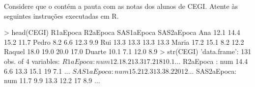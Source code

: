 \documentclass[addpoints]{exam}
\renewcommand*\half{.5}
\begin{document}
{\begin{questions}
	
	\question Considere que o  contém a pauta com as notas dos alunos de CEGI. Atente às seguintes instruções executadas em R.
	
		\begin{rcode}
			> head(CEGI)
			R1aEpoca R2aEpoca SAS1aEpoca SAS2aEpoca
			Ana        12.1     14.4       15.2       11.7
			Pedro       8.2      6.6       12.3        9.9
			Rui        13.3     13.3       13.3       13.3
			Maria      17.2     15.1        8.2       12.2
			Raquel     18.0     19.0       20.0       17.0
			Duarte     10.1      7.1       12.0        8.9
			> str(CEGI)
			'data.frame':	131 obs. of  4 variables:
			$ R1aEpoca  : num  12.1 8.2 13.3 17.2 18 10.1 ...
			$ R2aEpoca  : num  14.4 6.6 13.3 15.1 19 7.1 ...
			$ SAS1aEpoca: num  15.2 12.3 13.3 8.2 20 12 ...
			$ SAS2aEpoca: num  11.7 9.9 13.3 12.2 17 8.9 ...
		\end{rcode}
	

\end{questions}}
\end{document}
